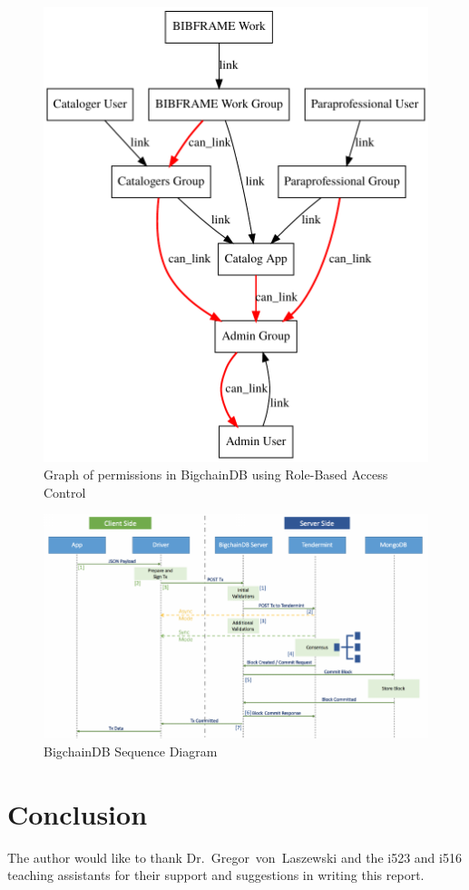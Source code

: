 \begin{figure}[!htb]
	\centering\includegraphics[width=\columnwidth]{images/rbac-graph.pdf}  
	\caption{Graph of permissions in BigchainDB using Role-Based Access 
	Control}\label{f:rbac2}
\end{figure}

\begin{figure}[!htb]
	\centering\includegraphics[width=\columnwidth]{images/bdb-seq.pdf}  
	\caption{BigchainDB Sequence Diagram~\cite{aA17}}\label{f:bdb2}
\end{figure}


\section{Conclusion}


\begin{acks}
The author would like to thank Dr.~Gregor~von~Laszewski and the i523
and i516 teaching assistants for their support and suggestions in writing
this report.
\end{acks}


 


